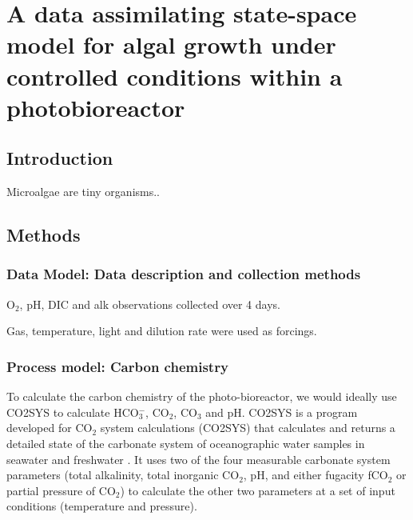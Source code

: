 \documentclass{ruthesis}
\begin{document}
\tableofcontents


\setcounter{chapter}{3}
\chapter{A data assimilating state-space model for algal growth under controlled conditions within a photobioreactor}\label{ch:Intro}


\section{Introduction}\label{sec:micro_intro} 

Microalgae are tiny organisms.. 









\section{Methods}

\subsection{Data Model: Data description and collection methods}

O$_2$, pH, DIC and alk observations collected over 4 days.


Gas, temperature, light and dilution rate were used as forcings.



\subsection{Process model: Carbon chemistry}

To calculate the carbon chemistry of the photo-bioreactor, we would ideally use CO2SYS \cite{lewis1998program} to calculate HCO$_3^-$, CO$_2$, CO$_3$ and pH. 
CO2SYS is a program developed for CO$_2$ system calculations (CO2SYS) that calculates and returns a detailed state of the carbonate system of oceanographic water samples in seawater and freshwater \cite{lewis1998program}.
It uses two of the four measurable carbonate system parameters (total alkalinity, total inorganic CO$_2$, pH, and either fugacity fCO$_2$ or partial pressure of CO$_2$) to calculate the other two parameters at a set of input conditions (temperature and pressure). 
\end{document}
